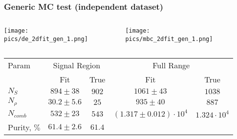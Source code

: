 \documentclass[10 pt,compress,mathserif]{beamer}
\begin{document}
\begin{frame}
 \frametitle{Generic MC test (independent dataset)}
 \begin{columns}
  \begin{column}{0.33\textwidth}
   \begin{center}
    \texttt{[image: pics/de\_2dfit\_gen\_1.png]}
   \end{center}
  \end{column}
  \begin{column}{0.33\textwidth}
   \begin{center}
    \texttt{[image: pics/mbc\_2dfit\_gen\_1.png]}
   \end{center}
  \end{column}
  \begin{column}{0.34\textwidth}
   \begin{center}
   \end{center}
  \end{column}
 \end{columns}
 
\begin{table}[bt]
 \small
 \begin{tabular}{|l|c|c|c|c|} \hline
Param & \multicolumn{2}{c|}{Signal Region}& \multicolumn{2}{c|}{Full Range}\\ \hhline{~----}
             &      Fit     & True  &      Fit      & True   \\ \hline
  $N_S$      & $894 \pm 38$ & $902$ & $1061 \pm 43$ & $1038$ \\ \hline
  $N_{\rho}$ & $30.2\pm 5.6$& $25$  & $935  \pm 40$ & $887$  \\ \hline
  $N_{comb}$ & $532 \pm 23$ & $543$ & $(1.317\pm 0.012)\cdot 10^4$ & $1.324\cdot 10^4$ \\ \hline
Purity, $\%$ &$61.4 \pm 2.6$& $61.4$ &  &  \\ \hline
 \end{tabular}
 \end{table}
\end{frame}
\end{document}
